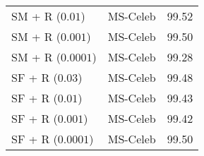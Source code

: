 \documentclass[10pt,twocolumn,letterpaper]{article}
\begin{document}
\begin{table}
\begin{tabular}{l c c }
\hline
SM + R  ($0.01$)    &  MS-Celeb     & 99.52    \\
SM + R  ($0.001$)   &  MS-Celeb     &  99.50  \\
SM + R  ($0.0001$)  & MS-Celeb   &    99.28    \\ 
\hline
SF + R  ($0.03$)   &   MS-Celeb     &    99.48  \\ 
SF + R  ($0.01$)   &   MS-Celeb     &    99.43 \\ 
SF + R  ($0.001$)   &   MS-Celeb     &   99.42 \\ 
SF + R  ($0.0001$)   &  MS-Celeb     &  99.50   \\ 

\hline
\end{tabular}
\label{tab_lfw} %
\end{table}
\end{document}
